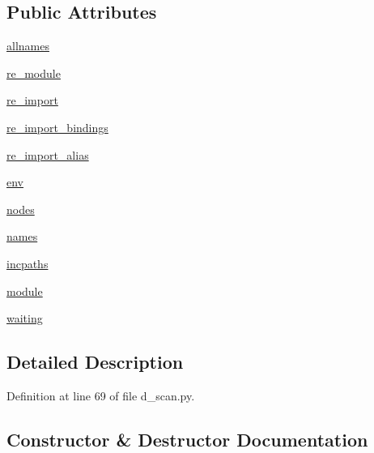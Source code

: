 \subsection*{Public Attributes}
\begin{DoxyCompactItemize}
\item 
\hyperlink{classwaflib_1_1_tools_1_1d__scan_1_1d__parser_a563353c3348d339a3819801c51618ba8}{allnames}
\item 
\hyperlink{classwaflib_1_1_tools_1_1d__scan_1_1d__parser_a944d317024ac254ad892584749321592}{re\+\_\+module}
\item 
\hyperlink{classwaflib_1_1_tools_1_1d__scan_1_1d__parser_ada8845d10e9524f02296c2db65f9ce39}{re\+\_\+import}
\item 
\hyperlink{classwaflib_1_1_tools_1_1d__scan_1_1d__parser_a9ce80344c741a4c2c362cac84db06f95}{re\+\_\+import\+\_\+bindings}
\item 
\hyperlink{classwaflib_1_1_tools_1_1d__scan_1_1d__parser_ae73756694932075139b67fa39957255c}{re\+\_\+import\+\_\+alias}
\item 
\hyperlink{classwaflib_1_1_tools_1_1d__scan_1_1d__parser_aa28424987acc747e7ef28b0126fcb2c2}{env}
\item 
\hyperlink{classwaflib_1_1_tools_1_1d__scan_1_1d__parser_a36c276a789c3937678296d63ad4e9b76}{nodes}
\item 
\hyperlink{classwaflib_1_1_tools_1_1d__scan_1_1d__parser_a26636ef4c93371e60b15c6c3ef66da1d}{names}
\item 
\hyperlink{classwaflib_1_1_tools_1_1d__scan_1_1d__parser_ab112695a99d61b3e5ae3d0014ae2210d}{incpaths}
\item 
\hyperlink{classwaflib_1_1_tools_1_1d__scan_1_1d__parser_af6091b0b2d246f228ab9cc93164303f2}{module}
\item 
\hyperlink{classwaflib_1_1_tools_1_1d__scan_1_1d__parser_aadca398fd062b9012d20b8a97995db38}{waiting}
\end{DoxyCompactItemize}


\subsection{Detailed Description}


Definition at line 69 of file d\+\_\+scan.\+py.



\subsection{Constructor \& Destructor Documentation}
